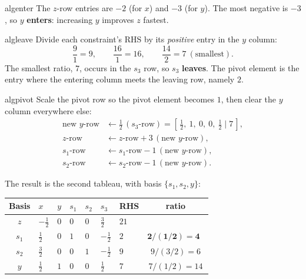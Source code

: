 \begin{steppanel}{algenter}
 The $z$-row entries are $-2$ (for $x$) and $-3$ (for $y$). The most negative is $-3$, so $y$ \textbf{enters}: increasing $y$ improves $z$ fastest.
\end{steppanel}
\begin{steppanel}{algleave}
 Divide each constraint's RHS by its \emph{positive} entry in the $y$ column:
\[
\frac{9}{1}=9,\qquad \frac{16}{1}=16,\qquad \frac{14}{2}=7\ (\text{smallest}).
\]
The smallest ratio, $7$, occurs in the $s_3$ row, so $s_3$ \textbf{leaves}. The pivot element is the entry where the entering column meets the leaving row, namely $2$.
\end{steppanel}
\begin{steppanel}{algpivot}
 Scale the pivot row so the pivot element becomes $1$, then clear the $y$ column everywhere else:
\[
\begin{aligned}
\text{new }y\text{-row} &\leftarrow \tfrac12\,(s_3\text{-row}) = [\,\tfrac12,\ 1,\ 0,\ 0,\ \tfrac12 \mid 7\,],\\
z\text{-row} &\leftarrow z\text{-row} + 3\,(\text{new }y\text{-row}),\\
s_1\text{-row} &\leftarrow s_1\text{-row} - 1\,(\text{new }y\text{-row}),\\
s_2\text{-row} &\leftarrow s_2\text{-row} - 1\,(\text{new }y\text{-row}).
\end{aligned}
\]
\end{steppanel}

\noindent The result is the second tableau, with basis $\{s_1,s_2,y\}$:
\begin{center}
\renewcommand{\arraystretch}{1.3}
\begin{tabular}{c|ZZZZZ|Z|c}
\toprule
Basis & $x$ & $y$ & $s_1$ & $s_2$ & $s_3$ & RHS & ratio\\
\midrule
$z$   & $-\tfrac12$ & $0$ & $0$ & $0$ & $\tfrac32$ & $21$ & \\
\midrule
{}$s_1$ & $\tfrac12$ & $0$ & $1$ & $0$ & $-\tfrac12$ & $2$ & $\mathbf{2/(1/2)=4}$\ \\
$s_2$ & $\tfrac32$ & $0$ & $0$ & $1$ & $-\tfrac12$ & $9$ & $9/(3/2)=6$\\
$y$   & $\tfrac12$ & $1$ & $0$ & $0$ & $\tfrac12$ & $7$ & $7/(1/2)=14$\\
\bottomrule
\end{tabular}
\end{center}

